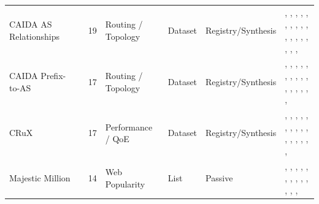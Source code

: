 \begin{table}[h!]
\begin{tabular}{lllllll}
CAIDA AS Relationships & \cite{asrelationships} & 19 & Routing / Topology & Dataset & Registry/Synthesis & \cite{10.1145/3646547.3689010}, \cite{10.1145/3618257.3624838}, \cite{10.1145/3618257.3624812}, \cite{10.1145/3517745.3561419}, \cite{10.1007/978-3-030-72582-2_14}, \cite{10.1007/978-3-030-98785-5_10}, \cite{10.1007/978-3-030-98785-5_14}, \cite{10.1007/978-3-030-98785-5_15}, \cite{10.1007/978-3-030-98785-5_20}, \cite{10.1007/978-3-030-98785-5_29}, \cite{10.1007/978-3-031-56252-5_4}, \cite{10.1007/978-3-031-85960-1_14}, \cite{10.1145/3777912.3839834}, \cite{10.1145/3777912.3839831}, \cite{10.1007/978-3-032-18268-5_5}, \cite{10.1145/3777912.3839828}, \cite{10.1145/3777912.3809144}, \cite{10.1145/3777912.3839812}, \cite{10.1145/3777912.3809137} \\
CAIDA Prefix-to-AS & \cite{caidapfx2as} & 17 & Routing / Topology & Dataset & Registry/Synthesis & \cite{10.1145/3618257.3624831}, \cite{10.1145/3517745.3561458}, \cite{10.1145/3517745.3561419}, \cite{10.1145/3517745.3561425}, \cite{10.1145/3487552.3487822}, \cite{10.1145/3487552.3487862}, \cite{10.1145/3487552.3487820}, \cite{10.1007/978-3-030-72582-2_32}, \cite{10.1007/978-3-030-98785-5_14}, \cite{10.1007/978-3-030-98785-5_15}, \cite{10.1007/978-3-030-98785-5_29}, \cite{10.1007/978-3-031-28486-1_10}, \cite{10.1145/3777912.3839834}, \cite{10.1145/3777912.3839831}, \cite{10.1007/978-3-032-18268-5_4}, \cite{10.1145/3777912.3839791}, \cite{10.1145/3777912.3839828} \\
CRuX & \cite{crux} & 17 & Performance / QoE & Dataset & Registry/Synthesis & \cite{10.1145/3730567.3764439}, \cite{10.1145/3730567.3764489}, \cite{10.1145/3730567.3764505}, \cite{10.1145/3618257.3624836}, \cite{10.1145/3618257.3624821}, \cite{10.1145/3618257.3624846}, \cite{10.1145/3517745.3561444}, \cite{10.1007/978-3-030-72582-2_5}, \cite{10.1007/978-3-031-28486-1_25}, \cite{10.1145/3777912.3839832}, \cite{10.1007/978-3-032-18268-5_1}, \cite{10.1007/978-3-032-18268-5_4}, \cite{10.1145/3777912.3839788}, \cite{10.1145/3777912.3839809}, \cite{10.1145/3777912.3839794}, \cite{10.1145/3777912.3839828}, \cite{10.1145/3777912.3839792} \\
Majestic Million & \cite{majesticmillion} & 14 & Web Popularity & List & Passive & \cite{10.1145/3730567.3764501}, \cite{10.1145/3646547.3688449}, \cite{10.1145/3618257.3624844}, \cite{10.1145/3618257.3624821}, \cite{10.1145/3517745.3561440}, \cite{10.1145/3517745.3561444}, \cite{10.1145/3487552.3487826}, \cite{10.1007/978-3-030-98785-5_22}, \cite{10.1007/978-3-031-56249-5_12}, \cite{10.1007/978-3-031-85960-1_3}, \cite{10.1007/978-3-031-85960-1_5}, \cite{10.1007/978-3-032-18268-5_1}, \cite{10.1145/3777912.3839801}, \cite{10.1145/3777912.3839807} \\

\end{tabular}
\end{table}
